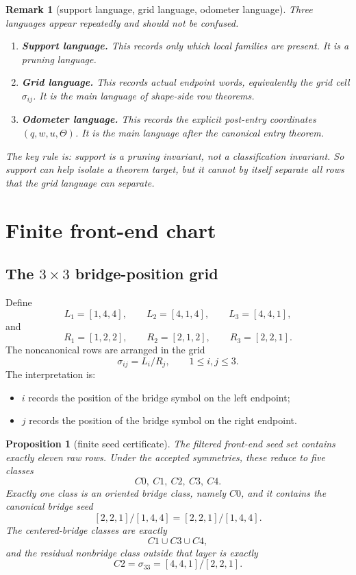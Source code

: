 \documentclass[11pt]{article}
\newtheorem{proposition}[theorem]{Proposition}
\newtheorem{remark}[theorem]{Remark}
\newcommand{\sig}[2]{\sigma_{#1#2}}
\newcommand{\CanL}{[2,2,1]}
\newcommand{\CanR}{[1,4,4]}
\newcommand{\CanSeed}{\CanL/\CanR}
\begin{document}
\begin{remark}[support language, grid language, odometer language]
Three languages appear repeatedly and should not be confused.
\begin{enumerate}[label=\textup{(\arabic*)},leftmargin=2.8em]
\item \textbf{Support language.}
      This records only which local families are present.
      It is a pruning language.
\item \textbf{Grid language.}
      This records actual endpoint words, equivalently the grid cell
      \(\sig{i}{j}\).
      It is the main language of shape-side row theorems.
\item \textbf{Odometer language.}
      This records the explicit post-entry coordinates
      \((q,w,u,\Theta)\).
      It is the main language after the canonical entry theorem.
\end{enumerate}
The key rule is:
\emph{support is a pruning invariant, not a classification invariant.}
So support can help isolate a theorem target, but it cannot by itself separate
all rows that the grid language can separate.
\end{remark}

\section{Finite front-end chart}

\subsection{\texorpdfstring{The \(3\times 3\)}{The 3x3} bridge-position grid}

Define
\[
L_1=[1,4,4],\qquad L_2=[4,1,4],\qquad L_3=[4,4,1],
\]
and
\[
R_1=[1,2,2],\qquad R_2=[2,1,2],\qquad R_3=[2,2,1].
\]
The noncanonical rows are arranged in the grid
\[
\sig{i}{j}=L_i/R_j,\qquad 1\le i,j\le 3.
\]
The interpretation is:
\begin{itemize}[leftmargin=2.4em]
\item \(i\) records the position of the bridge symbol on the left endpoint;
\item \(j\) records the position of the bridge symbol on the right endpoint.
\end{itemize}

\begin{proposition}[finite seed certificate]
\label{prop:finite-chart}
The filtered front-end seed set contains exactly eleven raw rows.
Under the accepted symmetries, these reduce to five classes
\[
C0,\ C1,\ C2,\ C3,\ C4.
\]
Exactly one class is an oriented bridge class, namely \(C0\), and it contains
the canonical bridge seed
\[
\CanSeed=\CanL/\CanR.
\]
The centered-bridge classes are exactly
\[
C1\cup C3\cup C4,
\]
and the residual nonbridge class outside that layer is exactly
\[
C2=\sig33=[4,4,1]/[2,2,1].
\]
\end{proposition}
\end{document}
